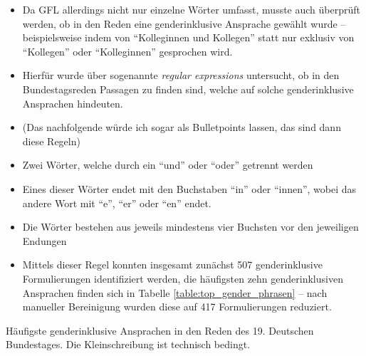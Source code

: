 \documentclass[12pt, 
    twoside=false, 
    bibliography=totoc, 
    numbers=endperiod, 
    headings=normal, 
    toc=chapterentrydotfill
    ]{scrbook}
\begin{document}
\begin{itemize}
    \item Da GFL allerdings nicht nur einzelne Wörter umfasst, musste auch überprüft werden, ob in den Reden eine genderinklusive Ansprache gewählt wurde -- beispielsweise indem von \enquote{Kolleginnen und Kollegen} statt nur exklusiv von \enquote{Kollegen} oder \enquote{Kolleginnen} gesprochen wird. 
    \item Hierfür wurde über sogenannte \emph{regular expressions} \parencite{thompson_1968} untersucht, ob in den Bundestagsreden Passagen zu finden sind, welche auf solche genderinklusive Ansprachen hindeuten.
    \item (Das nachfolgende würde ich sogar als Bulletpoints lassen, das sind dann diese Regeln)
    \item Zwei Wörter, welche durch ein \enquote{und} oder \enquote{oder} getrennt werden
    \item Eines dieser Wörter endet mit den Buchstaben \enquote{in} oder \enquote{innen}, wobei das andere Wort mit \enquote{e}, \enquote{er} oder \enquote{en} endet.
    \item Die Wörter bestehen aus jeweils mindestens vier Buchsten vor den jeweiligen Endungen
    \item Mittels dieser Regel konnten insgesamt zunächst 507 genderinklusive Formulierungen identifiziert werden, die häufigsten zehn genderinklusiven Ansprachen finden sich in Tabelle \ref{table:top_gender_phrasen}  -- nach manueller Bereinigung wurden diese auf 417 Formulierungen reduziert.
\end{itemize}

\begin{table}[htb]
    \centering
    \caption[Häufigste genderinklusive Ansprachen in den Reden des 19. Deutschen Bundestages]{Häufigste genderinklusive Ansprachen in den Reden des 19. Deutschen Bundestages. Die Kleinschreibung ist technisch bedingt.}
    
    \label{table:top_gender_phrasen}
\end{table}

\end{document}

